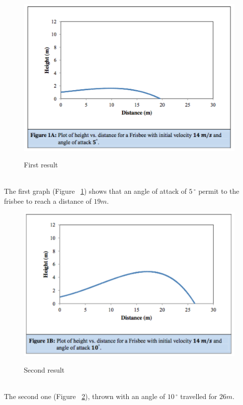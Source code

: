 \documentclass[10pt,a4paper]{report}
\begin{document}
\begin{figure}[H]
 \centering
\includegraphics[scale=0.6]{graph1.jpg}
\caption{First result}\cite{art5}
\label{First result}
\end{figure}
\leavevmode
\\The first graph (Figure ~\ref{First result}) shows that an angle of attack of $5\,^{\circ}$ permit to the frisbee to reach a distance of $19m$.
\begin{figure}[H]
\centering
\includegraphics[scale=0.6]{graph2.jpg}
\caption{Second result}\cite{art5}
\label{Second result}
\end{figure}
\leavevmode
\\The second one (Figure ~\ref{Second result}), thrown with an angle of $10\,^{\circ}$ travelled for $26m$.
\end{document}
